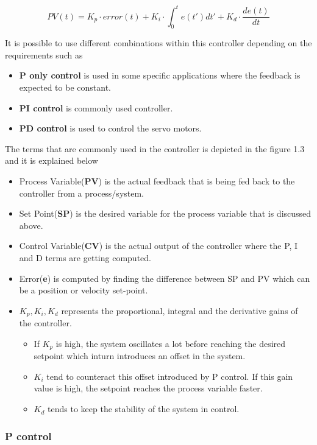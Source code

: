 \begin{equation}
PV(t) = K_p\cdot error(t) + K_i\cdot \int_{0}^{t} e(t') dt' + K_d\cdot \frac{de(t)}{dt}
\end{equation}

It is possible to use different combinations within this controller depending on the requirements such as

\begin{itemize}
\item \textbf{P only control} is used in some specific applications where the feedback is expected to be constant.
\item \textbf{PI control} is commonly used controller.
\item \textbf{PD control} is used to control the servo motors.
\end{itemize}

The terms that are commonly used in the controller is depicted in the figure 1.3 and it is explained below

\begin{itemize}
\item Process Variable(\textbf{PV}) is the actual feedback that is being fed back to the controller from a process/system. 
\item Set Point(\textbf{SP}) is the desired variable for the process variable that is discussed above.
\item Control Variable(\textbf{CV}) is the actual output of the controller where the P, I and D terms are getting computed.
\item Error(\textbf{e}) is computed by finding the difference between SP and PV which can be a position or velocity set-point.
\item $K_p, K_i, K_d$ represents the proportional, integral and the derivative gains of the controller.
\begin{itemize}
\item If $K_p$ is high, the system oscillates a lot before reaching the desired setpoint which inturn introduces an offset in the system. 
\item $K_i$ tend to counteract this offset introduced by P control. If this gain value is high, the setpoint reaches the process variable faster.
\item $K_d$ tends to keep the stability of the system in control.
\end{itemize}
\end{itemize}

\subsubsection*{P control}

